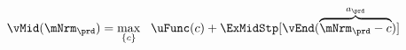   \begin{equation}\begin{gathered}\begin{aligned}
        \vMid(\mNrm_{\prd}) & = \max_{\{{c}\}}~~\uFunc({c}) +\ExMidStp[ \vEnd(\overbrace{\mNrm_{\prd}-{c}}^{a_{\prd}})] \label{eq:vMid}
      \end{aligned}\end{gathered}\end{equation}

